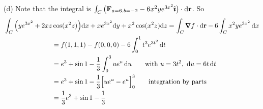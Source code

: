 \begin{solution}
\noindent (d) 
Note that the integral is 
  $\int_C\big(\mathbf{F}_{a=6,b=-2}-6x^2ye^{3x^2}\hat{\pmb{\imath}}\big)\cdot\mathrm{d}\mathbf{r}$.
So
\begin{align*}
&\int_C \Big(ye^{3x^2} + 2xz\cos(x^2 z)\Big) \dee{x} 
          + xe^{3x^2} \dee{y}
          + x^2 \cos(x^2 z) \dee{z}
 = \int_C \vnabla f\cdot\dee{\vr} -6\int_Cx^2ye^{3x^2}\,\dee{x} \\
&\hskip1in= f(1,1,1) -f(0,0,0) -6\int_0^1 t^3e^{3t^2}\,\dee{t} \\
&\hskip1in= e^3 +\sin 1 -\frac{1}{3}\int_0^3 ue^u\,\dee{u}\qquad
\text{with }u=3t^2,\ \dee{u} = 6t\,\dee{t} \\
&\hskip1in= e^3 +\sin 1 -\frac{1}{3}\Big[ue^u-e^u\Big]_0^3\qquad\text{integration by parts} \\
&\hskip1in= \frac{1}{3} e^3 +\sin 1 -\frac{1}{3}
\end{align*}


\end{solution}








